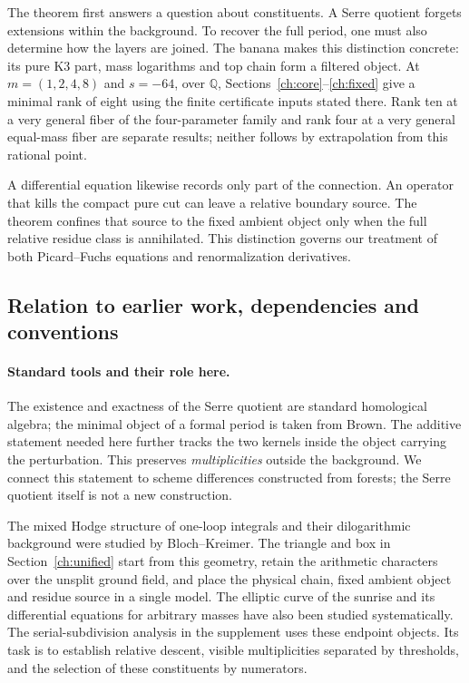 \documentclass[11pt,a4paper,oneside]{article}
\theoremstyle{plain}
\theoremstyle{definition}
\theoremstyle{remark}
\numberwithin{equation}{section}
\begin{document}
The theorem first answers a question about constituents. A Serre quotient forgets extensions within the background. To recover the full period, one must also determine how the layers are joined. The banana makes this distinction concrete: its pure K3 part, mass logarithms and top chain form a filtered object. At $m=(1,2,4,8)$ and $s=-64$, over $\mathbb Q$, Sections~\ref{ch:core}--\ref{ch:fixed} give a minimal rank of eight using the finite certificate inputs stated there. Rank ten at a very general fiber of the four-parameter family and rank four at a very general equal-mass fiber are separate results; neither follows by extrapolation from this rational point.

A differential equation likewise records only part of the connection. An operator that kills the compact pure cut can leave a relative boundary source. The theorem confines that source to the fixed ambient object only when the full relative residue class is annihilated. This distinction governs our treatment of both Picard--Fuchs equations and renormalization derivatives.

\subsection{Relation to earlier work, dependencies and conventions}
\paragraph{Standard tools and their role here.}
The existence and exactness of the Serre quotient are standard homological algebra\cite{stacks}; the minimal object of a formal period is taken from Brown\cite{brownperiods}. The additive statement needed here further tracks the two kernels inside the object carrying the perturbation. This preserves \emph{multiplicities} outside the background. We connect this statement to scheme differences constructed from forests; the Serre quotient itself is not a new construction.

The mixed Hodge structure of one-loop integrals and their dilogarithmic background were studied by Bloch--Kreimer\cite{bkone}. The triangle and box in Section~\ref{ch:unified} start from this geometry, retain the arithmetic characters over the unsplit ground field, and place the physical chain, fixed ambient object and residue source in a single model. The elliptic curve of the sunrise and its differential equations for arbitrary masses have also been studied systematically\cite{abwsun,bkvsunset}. The serial-subdivision analysis in the supplement uses these endpoint objects. Its task is to establish relative descent, visible multiplicities separated by thresholds, and the selection of these constituents by numerators.
\end{document}
